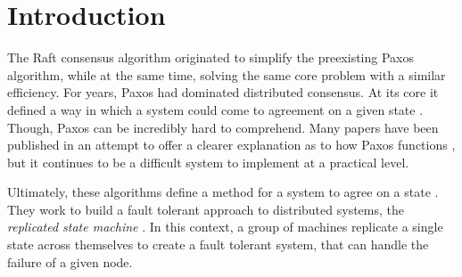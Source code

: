 \section{Introduction}

The Raft consensus algorithm originated to simplify the 
preexisting Paxos algorithm, while at the same time, 
solving the same core problem \cite{OngaroRaft} with a 
similar efficiency. For years, Paxos had dominated 
distributed consensus. At its core it defined a way in 
which a system could come to agreement on a given state 
\cite{LamportPPT}. Though, Paxos can be incredibly hard 
to comprehend. Many papers have been published in an 
attempt to offer a clearer explanation as to how Paxos 
functions \cite{LamportSimple, MazieresPractical}, but it 
continues to be a difficult system to implement at a 
practical level.

Ultimately, these algorithms define a method for a system to agree on a state \cite{BrandFSM}. They work to build a fault tolerant approach to distributed systems, the \textit{replicated state machine} \cite{SchneiderFSM}. In this context, a group of machines replicate a single state across themselves to create a fault tolerant system, that can handle the failure of a given node.